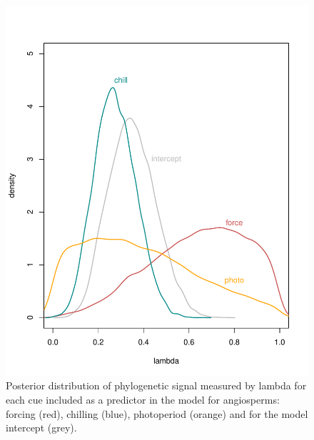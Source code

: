 \documentclass{article}\usepackage[]{graphicx}\usepackage[]{color}
\begin{document}
\begin{figure} [H]
  \begin{center}
  \includegraphics[width=14cm]{..//..//analyses/phylogeny/figures/lambdas_density.pdf}
  \caption{Posterior distribution of phylogenetic signal measured by lambda for each cue included as a predictor in the model for angiosperms: forcing (red), chilling (blue),  photoperiod (orange) and for the model intercept (grey).}
  \label{fig:phylosig_angio}
  \end{center}
\end{figure}
\end{document}
